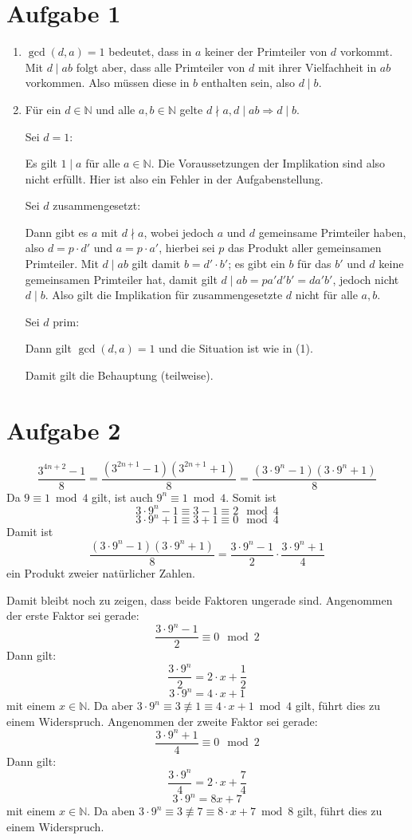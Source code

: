 \section*{Aufgabe 1}
\begin{enumerate}[(1)]
\item
$\gcd(d,a) = 1$ bedeutet, dass in $a$ keiner der Primteiler von $d$ vorkommt. Mit $d \mid ab$ folgt aber, dass alle Primteiler von $d$ mit ihrer Vielfachheit in $ab$ vorkommen. Also müssen diese in $b$ enthalten sein, also $d \mid b$.

\item
Für ein $d \in \mathbb{N}$ und alle $a, b \in \mathbb{N}$ gelte $d \nmid a, d \mid ab \Rightarrow d \mid b$.

Sei $d=1$:

Es gilt $1 \mid a$ für alle $a \in \mathbb{N}$. Die Voraussetzungen der Implikation sind also nicht erfüllt. Hier ist also ein Fehler in der Aufgabenstellung.

Sei $d$ zusammengesetzt:

Dann gibt es $a$ mit $d \nmid a$, wobei jedoch $a$ und $d$ gemeinsame Primteiler haben, also $d = p \cdot d'$ und $a = p \cdot a'$, hierbei sei $p$ das Produkt aller gemeinsamen Primteiler.
Mit $ d \mid ab$ gilt damit $b = d' \cdot b'$; es gibt ein $b$ für das $b'$ und $d$ keine gemeinsamen Primteiler hat, damit gilt $d \mid ab = p a' d' b' = d a' b'$, jedoch nicht $d \mid b$. Also gilt die Implikation für zusammengesetzte $d$ nicht für alle $a,b$.

Sei $d$ prim:

Dann gilt $\gcd(d,a) = 1$ und die Situation ist wie in (1). 

Damit gilt die Behauptung (teilweise).
\end{enumerate}


\section*{Aufgabe 2}
\[ \frac{3^{4n +2}-1}{8} = \frac{(3^{2n+1} - 1)(3^{2n+1}+1)}{8} = \frac{(3 \cdot 9^n - 1)(3 \cdot 9^n+1)}{8}\]
Da $9 \equiv 1 \bmod 4$ gilt, ist auch $9^n \equiv 1 \bmod 4$. Somit ist 
\[ 3 \cdot 9^n - 1 \equiv 3 - 1 \equiv 2 \mod 4 \]
\[ 3 \cdot 9^n + 1 \equiv 3 + 1 \equiv 0 \mod 4 \]
Damit ist 
\[  \frac{(3 \cdot 9^n - 1)(3 \cdot 9^n+1)}{8} = \frac{3 \cdot 9^n - 1}{2} \cdot \frac{3 \cdot 9^n + 1}{4} \]
ein Produkt zweier natürlicher Zahlen.

Damit bleibt noch zu zeigen, dass beide Faktoren ungerade sind.
Angenommen der erste Faktor sei gerade: 
\[  \frac{3 \cdot 9^n - 1}{2} \equiv 0 \mod 2 \]
Dann gilt:
\[  \frac{3 \cdot 9^n}{2} = 2\cdot x + \frac{1}{2} \]
\[ 3 \cdot 9^n = 4\cdot  x + 1 \]
mit einem $x \in \mathbb{N} $. Da aber $3 \cdot 9^n \equiv 3 \not\equiv 1 \equiv 4\cdot x + 1 \bmod 4$ gilt,
führt dies zu einem Widerspruch.
Angenommen der zweite Faktor sei gerade:
\[ \frac{3 \cdot 9^n + 1}{4} \equiv 0 \mod 2\]
Dann gilt:
\[  \frac{3 \cdot 9^n}{4} = 2\cdot x + \frac{7}{4} \]
\[ 3 \cdot 9^n = 8x + 7 \]
mit einem $x \in \mathbb{N}$. Da aben $3 \cdot 9^n \equiv 3 \not\equiv 7 \equiv 8\cdot x + 7 \bmod 8$ gilt,
führt dies zu einem Widerspruch.

